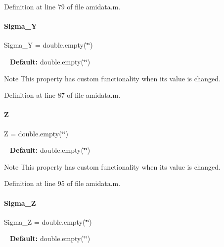 Definition at line 79 of file amidata.\+m.

\mbox{\label{classamidata_a4bd82fb17b03a0039c2f0347ec8dc393}} 
\paragraph{\texorpdfstring{Sigma\_Y}{Sigma\_Y}}
{\footnotesize\ttfamily Sigma\+\_\+Y = double.\+empty(\char`\"{}\char`\"{})}

~\newline
{\bfseries{Default\+:}} double.\+empty(\char`\"{}\char`\"{})

\begin{DoxyNote}{Note}
This property has custom functionality when its value is changed. 
\end{DoxyNote}


Definition at line 87 of file amidata.\+m.

\mbox{\label{classamidata_adc18d83abfd9f87d396e8fd6b6ac0fe1}} 
\paragraph{\texorpdfstring{Z}{Z}}
{\footnotesize\ttfamily Z = double.\+empty(\char`\"{}\char`\"{})}

~\newline
{\bfseries{Default\+:}} double.\+empty(\char`\"{}\char`\"{})

\begin{DoxyNote}{Note}
This property has custom functionality when its value is changed. 
\end{DoxyNote}


Definition at line 95 of file amidata.\+m.

\mbox{\label{classamidata_a77b1f0ddcfbfb895b17d62a414d35673}} 
\paragraph{\texorpdfstring{Sigma\_Z}{Sigma\_Z}}
{\footnotesize\ttfamily Sigma\+\_\+Z = double.\+empty(\char`\"{}\char`\"{})}

~\newline
{\bfseries{Default\+:}} double.\+empty(\char`\"{}\char`\"{})

